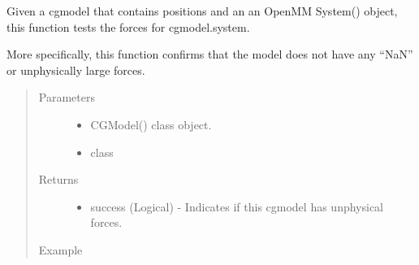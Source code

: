 \documentclass[letterpaper,12pt,english,openany,oneside]{sphinxmanual}
\begin{document}
\begin{fulllineitems}
\label{\detokenize{build:build.cg_build.test_forces}}
Given a cgmodel that contains positions and an
an OpenMM System() object, this function tests 
the forces for cgmodel.system.

More specifically, this function confirms that the
model does not have any “NaN” or unphysically large forces.
\begin{quote}\begin{description}
\item[{Parameters}] \leavevmode\begin{itemize}
\item {} 
 \textendash{} CGModel() class object.

\item {} 
 \textendash{} class

\end{itemize}

\item[{Returns}] \leavevmode
\begin{itemize}
\item {} 
success (Logical) - Indicates if this cgmodel has unphysical forces.

\end{itemize}


\item[{Example}] \leavevmode
\end{description}\end{quote}

\begin{sphinxVerbatim}[commandchars=\\\{\}]
   
  
  
\end{sphinxVerbatim}

\end{fulllineitems}

\end{document}
